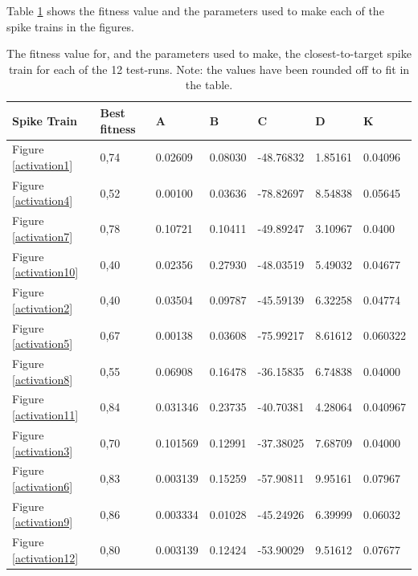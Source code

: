 \documentclass[12pt, a4paper, oneside, titlepage]{article}
\begin{document}
Table \ref{table} shows the fitness value and the parameters used to make each of the spike trains in the figures.

\begin{table}
	\begin{tabular}{|l|l|l|l|l|l|l|} 
	\hline
	Spike Train & Best fitness & A & B& C& D& K \\ \hline
	Figure \ref{activation1} & 0,74 & 	 0.02609& 0.08030&-48.76832& 1.85161	&0.04096\\
	Figure \ref{activation4} & 0,52	&    0.00100& 0.03636&-78.82697& 8.54838	&0.05645\\
	Figure \ref{activation7} & 0,78&	 0.10721& 0.10411& -49.89247&	 3.10967& 0.0400\\
	Figure \ref{activation10} & 0,40&  	 0.02356& 0.27930& -48.03519& 5.49032&	 0.04677\\ \hline
	Figure \ref{activation2} & 0,40&  	 0.03504& 0.09787& -45.59139&	 6.32258&	 0.04774\\
	Figure \ref{activation5} & 0,67&	 0.00138& 0.03608&	 -75.99217&	 8.61612&	 0.060322\\
	Figure \ref{activation8} & 0,55&	 0.06908& 0.16478& -36.15835&	 6.74838& 0.04000\\
	Figure \ref{activation11} & 0,84&	 0.031346& 0.23735&	 -40.70381&	 4.28064&	 0.040967\\ \hline
	Figure \ref{activation3} & 0,70&	 0.101569& 0.12991&	 -37.38025&	 7.68709&	 0.04000\\
	Figure \ref{activation6} & 0,83&	 0.003139& 0.15259& -57.90811&	 9.95161& 0.07967\\
	Figure \ref{activation9} & 0,86&	 0.003334& 0.01028& -45.24926&	 6.39999& 0.06032\\
	Figure \ref{activation12} &0,80&	 0.003139& 0.12424& -53.90029&	 9.51612& 0.07677\\ \hline
	\end{tabular}
	\caption{The fitness value for, and the parameters used to make, the closest-to-target spike train for each of the 12 test-runs. Note: the values have been rounded off to fit in the table.}
	\label{table}
\end{table}
\end{document}
